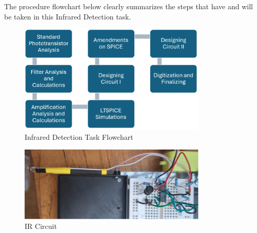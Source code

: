 The procedure flowchart below clearly summarizes the steps that have and will be taken in this Infrared Detection task.
\begin{figure}[h]
    \centering
    \includegraphics[width=0.8\textwidth]{subpages/images/ir_procedure.png}
    \caption{Infrared Detection Task Flowchart}
    \label{fig:ir_flowchart}
\end{figure}
\begin{figure}[h]
    \centering
    \includegraphics[width=0.8\textwidth]{subpages/images/ir_irl.png}
    \caption{IR Circuit}
    \label{fig:ir_circuit}
\end{figure}

